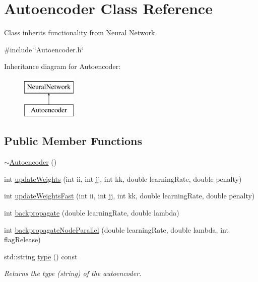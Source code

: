 \hypertarget{classAutoencoder}{}\section{Autoencoder Class Reference}
\label{classAutoencoder}


Class inherits functionality from Neural Network.  




{\ttfamily \#include \char`\"{}Autoencoder.\+h\char`\"{}}

Inheritance diagram for Autoencoder\+:\begin{figure}[H]
\begin{center}
\leavevmode
\includegraphics[height=2.000000cm]{classAutoencoder}
\end{center}
\end{figure}
\subsection*{Public Member Functions}
\begin{DoxyCompactItemize}
\item 
\hyperlink{classAutoencoder_a8749324f51cade4a1a21284f47097384}{$\sim$\+Autoencoder} ()
\item 
int \hyperlink{classAutoencoder_a4730a37272e51bef6c1a50efc9322fbe}{update\+Weights} (int ii, int jj, int kk, double learning\+Rate, double penalty)
\item 
int \hyperlink{classAutoencoder_aba5d429d35741aadbaf350364f64af7c}{update\+Weights\+Fast} (int ii, int jj, int kk, double learning\+Rate, double penalty)
\item 
int \hyperlink{classAutoencoder_a1a52083d0822fec947b93edf0797880f}{backpropagate} (double learning\+Rate, double lambda)
\item 
int \hyperlink{classAutoencoder_aa5832a7ff94e5af13d6fa41489796d82}{backpropagate\+Node\+Parallel} (double learning\+Rate, double lambda, int flag\+Release)
\item 
std\+::string \hyperlink{classAutoencoder_a0a306ad1b822c63cdcfe99a33233f7ea}{type} () const 
\begin{DoxyCompactList}\small\item\em Returns the type (string) of the autoencoder. \end{DoxyCompactList}\end{DoxyCompactItemize}
